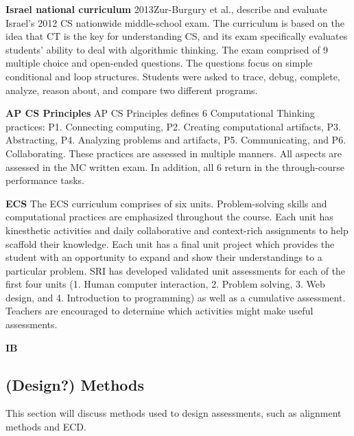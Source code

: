 \noindent\textbf{Israel national curriculum}
2013Zur-Burgury et al., describe and evaluate Israel's 2012 CS nationwide middle-school exam. The curriculum is based on the idea that CT is the key for understanding CS, and its exam specifically evaluates students' ability to deal with algorithmic thinking. The exam comprised of 9 multiple choice and open-ended questions. The questions focus on simple conditional and loop structures. Students were asked to trace, debug, complete, analyze, reason about, and compare two different programs.

\noindent\textbf{AP CS Principles}
AP CS Principles defines 6 Computational Thinking practices: P1. Connecting computing, P2. Creating computational artifacts, P3. Abstracting, P4. Analyzing problems and artifacts, P5. Communicating, and P6. Collaborating. These practices are assessed in multiple manners. All aspects are assessed in the MC written exam. In addition, all 6 return in the through-course performance tasks.

\noindent\textbf{ECS}
The ECS  curriculum comprises of six units. Problem-solving skills and computational practices are emphasized throughout the course. Each unit has kinesthetic activities and daily collaborative and context-rich assignments to help scaffold their knowledge. Each unit has a final unit project which provides the student with an opportunity to expand and show their understandings to a particular problem. SRI has developed validated unit assessments for each of the first four units (1. Human computer interaction, 2. Problem solving, 3. Web design, and 4. Introduction to programming) as well as a cumulative assessment. Teachers are encouraged to determine which activities might make useful assessments.


\noindent\textbf{IB}



\subsection{(Design?) Methods}
This section will discuss methods used to design assessments, such as alignment methods and ECD.


